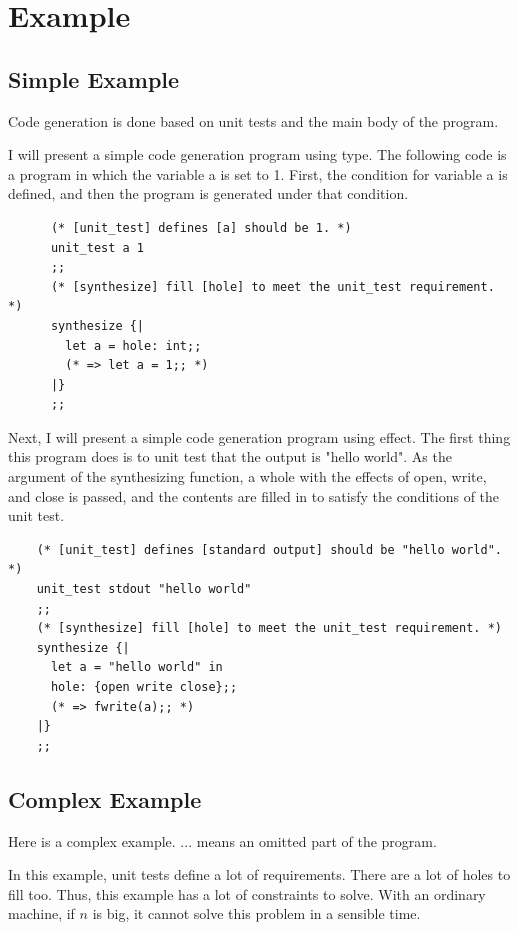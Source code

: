 \documentclass[12pt, a4paper, titlepage]{report}
\begin{document}
  \section{Example}\label{section:example}
  \subsection{Simple Example}\label{subsection:simple_example}
  Code generation is done based on unit tests and the main body of the program.

  I will present a simple code generation program using type.
  The following code is a program in which the variable a is set to 1.
  First, the condition for variable a is defined, and then the program is generated under that condition.
  \begin{verbatim}
      (* [unit_test] defines [a] should be 1. *)
      unit_test a 1
      ;;
      (* [synthesize] fill [hole] to meet the unit_test requirement. *)
      synthesize {|
        let a = hole: int;;
        (* => let a = 1;; *)
      |}
      ;;
    \end{verbatim}

  Next, I will present a simple code generation program using effect.
  The first thing this program does is to unit test that the output is "hello world".
  As the argument of the synthesizing function, a whole with the effects of open, write, and close is passed, and the contents are filled in to satisfy the conditions of the unit test.
  \begin{verbatim}
    (* [unit_test] defines [standard output] should be "hello world". *)
    unit_test stdout "hello world"
    ;;
    (* [synthesize] fill [hole] to meet the unit_test requirement. *)
    synthesize {|
      let a = "hello world" in
      hole: {open write close};;
      (* => fwrite(a);; *)
    |}
    ;;
  \end{verbatim}

  \subsection{Complex Example}\label{subsection:complex_example}

  Here is a complex example.
  $...$ means an omitted part of the program.

  In this example, unit tests define a lot of requirements.
  There are a lot of holes to fill too.
  Thus, this example has a lot of constraints to solve.
  With an ordinary machine, if $n$ is big, it cannot solve this problem in a sensible time.
\end{document}

